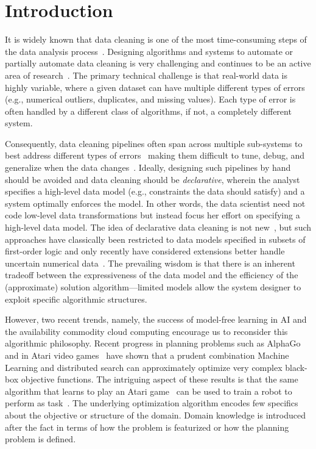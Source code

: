 \section{Introduction}\label{intro}\sloppy
It is widely known that data cleaning is one of the most time-consuming steps of the data analysis process~\cite{nytimes}.
Designing algorithms and systems to automate or partially automate data cleaning is very challenging and continues to be an active area of research~\cite{DBLP:conf/sigmod/ChuIKW16}.
The primary technical challenge is that real-world data is highly variable, where a given dataset can have multiple different types of errors (e.g., numerical outliers, duplicates, and missing values).
Each type of error is often handled by a different class of algorithms, if not, a completely different system.

Consequently, data cleaning pipelines often span across multiple sub-systems to best address different types of errors~\cite{krishnan2016hilda} making them difficult to tune, debug, and generalize when the data changes~\cite{sculley2014machine,krishnan2016hilda}.
Ideally, designing such pipelines by hand should be avoided and data cleaning should be \emph{declarative}, wherein the analyst specifies a high-level data model (e.g., constraints the data should satisfy) and a system optimally enforces the model.
In other words, the data scientist need not code low-level data transformations but instead focus her effort on specifying a high-level data model.
The idea of declarative data cleaning is not new~\cite{rahm2000data}, but such approaches have classically been restricted to data models specified in subsets of first-order logic and only recently have considered extensions better handle uncertain numerical data~\cite{prokoshyna2015combining}.
The prevailing wisdom is that there is an inherent tradeoff between the expressiveness of the data model and the efficiency of the (approximate) solution algorithm---limited models allow the system designer to exploit specific algorithmic structures.

However, two recent trends, namely, the success of model-free learning in AI and the availability commodity cloud computing encourage us to reconsider this algorithmic philosophy.
Recent progress in planning problems such as AlphaGo~\cite{silver2016mastering} and in Atari video games~\cite{mnih2015human} have shown that a prudent combination Machine Learning and distributed search can approximately optimize very complex black-box objective functions.
The intriguing aspect of these results is that the same algorithm that learns to play an Atari game~\cite{mnih2015human} can be used to train a robot to perform as task~\cite{gu2017deep}.
The underlying optimization algorithm encodes few specifics about the objective or structure of the domain.
Domain knowledge is introduced after the fact in terms of how the problem is featurized or how the planning problem is defined.


